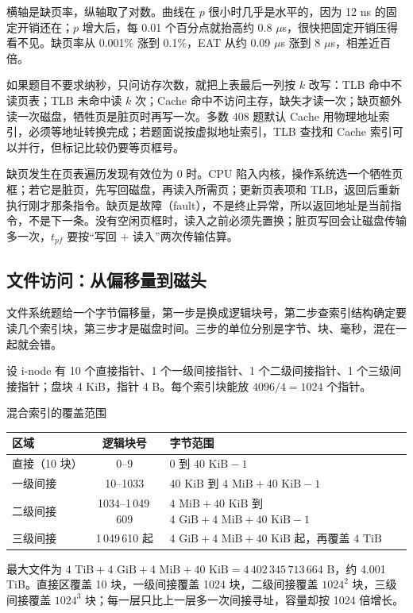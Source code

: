 横轴是缺页率，纵轴取了对数。曲线在 $p$ 很小时几乎是水平的，因为 12 ns 的固定开销还在；$p$ 增大后，每 0.01 个百分点就抬高约 0.8 $\mu$s，很快把固定开销压得看不见。缺页率从 0.001\% 涨到 0.1\%，EAT 从约 0.09 $\mu$s 涨到 8 $\mu$s，相差近百倍。

如果题目不要求纳秒，只问访存次数，就把上表最后一列按 $k$ 改写：TLB 命中不读页表；TLB 未命中读 $k$ 次；Cache 命中不访问主存，缺失才读一次；缺页额外读一次磁盘，牺牲页是脏页时再写一次。多数 408 题默认 Cache 用物理地址索引，必须等地址转换完成；若题面说按虚拟地址索引，TLB 查找和 Cache 索引可以并行，但标记比较仍要等页框号。

缺页发生在页表遍历发现有效位为 0 时。CPU 陷入内核，操作系统选一个牺牲页框；若它是脏页，先写回磁盘，再读入所需页；更新页表项和 TLB，返回后重新执行刚才那条指令。缺页是故障（fault），不是终止异常，所以返回地址是当前指令，不是下一条。没有空闲页框时，读入之前必须先置换；脏页写回会让磁盘传输多一次，$t_{pf}$ 要按“写回 $+$ 读入”两次传输估算。

\subsection{文件访问：从偏移量到磁头}

文件系统题给一个字节偏移量，第一步是换成逻辑块号，第二步查索引结构确定要读几个索引块，第三步才是磁盘时间。三步的单位分别是字节、块、毫秒，混在一起就会错。

设 i-node 有 10 个直接指针、1 个一级间接指针、1 个二级间接指针、1 个三级间接指针；盘块 4 KiB，指针 4 B。每个索引块能放 $4096/4=1024$ 个指针。

\begin{tablebox}{混合索引的覆盖范围}
\centering
\small
\begin{tabularx}{\linewidth}{|l|c|X|}
\hline
区域 & 逻辑块号 & 字节范围 \\
\hline
直接（10 块） & 0--9 & $0$ 到 $40\text{ KiB}-1$ \\
一级间接 & 10--1033 & $40\text{ KiB}$ 到 $4\text{ MiB}+40\text{ KiB}-1$ \\
二级间接 & 1034--1\,049\,609 & $4\text{ MiB}+40\text{ KiB}$ 到 $4\text{ GiB}+4\text{ MiB}+40\text{ KiB}-1$ \\
三级间接 & 1\,049\,610 起 & $4\text{ GiB}+4\text{ MiB}+40\text{ KiB}$ 起，再覆盖 $4\text{ TiB}$ \\
\hline
\end{tabularx}
\end{tablebox}

最大文件为 $4\text{ TiB}+4\text{ GiB}+4\text{ MiB}+40\text{ KiB}=4\,402\,345\,713\,664$ B，约 4.001 TiB。直接区覆盖 10 块，一级间接覆盖 1024 块，二级间接覆盖 $1024^2$ 块，三级间接覆盖 $1024^3$ 块；每一层只比上一层多一次间接寻址，容量却按 1024 倍增长。

